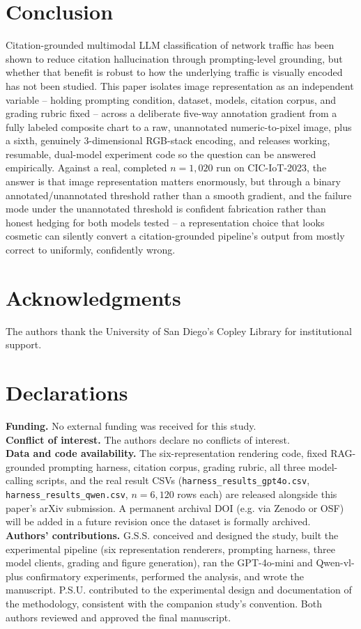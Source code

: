 \documentclass[11pt]{article}
\begin{document}
\section{Conclusion}

Citation-grounded multimodal LLM classification of network traffic has been shown to reduce
citation hallucination through prompting-level grounding, but whether that benefit is robust to how
the underlying traffic is visually encoded has not been studied. This paper isolates image
representation as an independent variable -- holding prompting condition, dataset, models, citation
corpus, and grading rubric fixed -- across a deliberate five-way annotation gradient from a fully
labeled composite chart to a raw, unannotated numeric-to-pixel image, plus a sixth, genuinely
3-dimensional RGB-stack encoding, and releases working, resumable, dual-model experiment code so the
question can be answered empirically. Against a real, completed $n=1{,}020$ run on CIC-IoT-2023, the
answer is that image representation matters enormously, but through a binary annotated/unannotated
threshold rather than a smooth gradient, and the failure mode under the unannotated threshold is
confident fabrication rather than honest hedging for both models tested -- a representation choice
that looks cosmetic can silently convert a citation-grounded pipeline's output from mostly correct to
uniformly, confidently wrong.

\section*{Acknowledgments}

The authors thank the University of San Diego's Copley Library for institutional support.

\section*{Declarations}

\textbf{Funding.} No external funding was received for this study.\\
\textbf{Conflict of interest.} The authors declare no conflicts of interest.\\
\textbf{Data and code availability.} The six-representation rendering code, fixed RAG-grounded
prompting harness, citation corpus, grading rubric, all three model-calling scripts, and the real
result CSVs (\texttt{harness\_results\_gpt4o.csv}, \texttt{harness\_results\_qwen.csv}, $n=6{,}120$
rows each) are released alongside this paper's arXiv submission. A permanent archival DOI (e.g. via
Zenodo or OSF) will be added in a future revision once the dataset is formally archived.\\
\textbf{Authors' contributions.} G.S.S. conceived and designed the study, built the experimental
pipeline (six representation renderers, prompting harness, three model clients, grading and figure
generation), ran the GPT-4o-mini and Qwen-vl-plus confirmatory experiments, performed the analysis,
and wrote the manuscript. P.S.U. contributed to the experimental design and documentation of the
methodology, consistent with the companion study's convention. Both authors reviewed and approved
the final manuscript.
\end{document}
